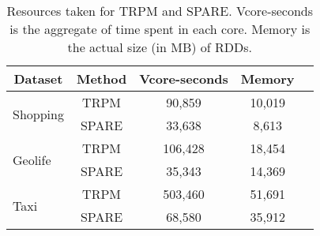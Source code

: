 \begin{table}[h]
\centering
\begin{tabular}{|l|c|c|c|c|}
\hline
\multicolumn{1}{|c|}{\textbf{Dataset}} & \textbf{Method} %
& \textbf{Vcore-seconds} & \textbf{Memory} \\ \hline
\multirow{2}{*}{Shopping}              & TRPM           %
                               & 90,859                 & 10,019               \\ %
                                       & SPARE           %
                                                                      & 33,638                 & 8,613                \\ \hline
\multirow{2}{*}{Geolife}               & TRPM            %
                              & 106,428                & 18,454               \\ %
                                       & SPARE           %
                                                                     & 35,343                 & 14,369               \\ \hline
\multirow{2}{*}{Taxi}                  & TRPM            %
                           & 503,460                & 51,691               \\ %
                                       & SPARE           %
                                                                    & 68,580                & 35,912               \\ \hline
\end{tabular}
 \vspace{-0.5em}
\caption{Resources taken for TRPM and SPARE. Vcore-seconds is the aggregate of time spent in each core. Memory is the actual size (in MB) of RDDs.}
\vspace{-0.5em}
\label{tbl:resource}
\end{table}

